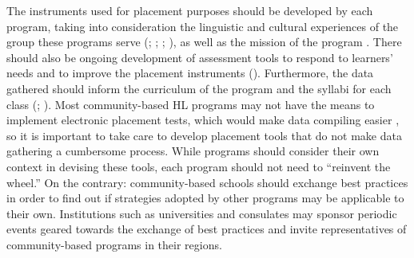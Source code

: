 \documentclass[output=paper]{langscibook}
\begin{document}
The instruments used for placement purposes should be developed by each program, taking into consideration the linguistic and cultural experiences of the group these programs serve (\citealt{BeaudrieDucar2012}; \citealt{MacGregor-Mendoza2012}; \citealt{VergaraWilson2012}; \citealt{Son2017}), as well as the mission of the program \citep{Fairclough2012a}. There should also be ongoing development of assessment tools to respond to learners’ needs and to improve the placement instruments (\citealt{BeaudrieDucar2012}). Furthermore, the data gathered should inform the curriculum of the program and the syllabi for each class (\citealt{Carreira2012b}; \citealt{IlievaClark-Gareca2016}). Most community-based HL programs may not have the means to implement electronic placement tests, which would make data compiling easier \citep{FaircloughBermejo2010}, so it is important to take care to develop placement tools that do not make data gathering a cumbersome process. While programs should consider their own context in devising these tools, each program should not need to “reinvent the wheel.” On the contrary: community-based schools should exchange best practices in order to find out if strategies adopted by other programs may be applicable to their own. Institutions such as universities and consulates may sponsor periodic events geared towards the exchange of best practices and invite representatives of community-based programs in their regions.
\end{document}
